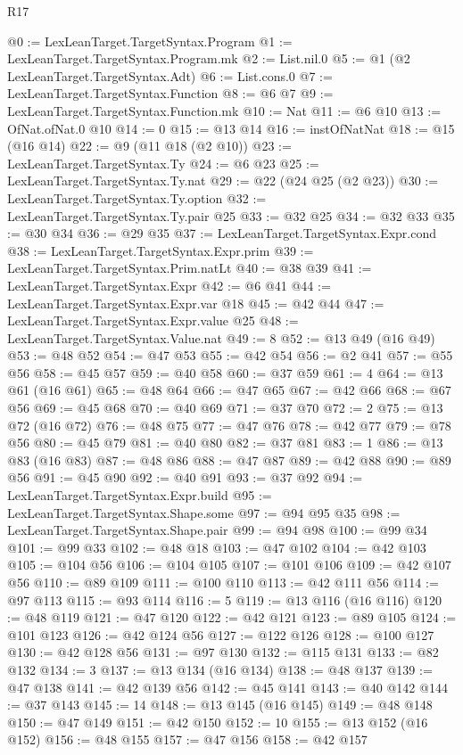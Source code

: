 \begin{lexlean}{R17}
\begin{coremodule}
@0 := LexLeanTarget.TargetSyntax.Program
@1 := LexLeanTarget.TargetSyntax.Program.mk
@2 := List.nil.{0}
@5 := @1 (@2 LexLeanTarget.TargetSyntax.Adt)
@6 := List.cons.{0}
@7 := LexLeanTarget.TargetSyntax.Function
@8 := @6 @7
@9 := LexLeanTarget.TargetSyntax.Function.mk
@10 := Nat
@11 := @6 @10
@13 := OfNat.ofNat.{0} @10
@14 := 0
@15 := @13 @14
@16 := instOfNatNat
@18 := @15 (@16 @14)
@22 := @9 (@11 @18 (@2 @10))
@23 := LexLeanTarget.TargetSyntax.Ty
@24 := @6 @23
@25 := LexLeanTarget.TargetSyntax.Ty.nat
@29 := @22 (@24 @25 (@2 @23))
@30 := LexLeanTarget.TargetSyntax.Ty.option
@32 := LexLeanTarget.TargetSyntax.Ty.pair @25
@33 := @32 @25
@34 := @32 @33
@35 := @30 @34
@36 := @29 @35
@37 := LexLeanTarget.TargetSyntax.Expr.cond
@38 := LexLeanTarget.TargetSyntax.Expr.prim
@39 := LexLeanTarget.TargetSyntax.Prim.natLt
@40 := @38 @39
@41 := LexLeanTarget.TargetSyntax.Expr
@42 := @6 @41
@44 := LexLeanTarget.TargetSyntax.Expr.var @18
@45 := @42 @44
@47 := LexLeanTarget.TargetSyntax.Expr.value @25
@48 := LexLeanTarget.TargetSyntax.Value.nat
@49 := 8
@52 := @13 @49 (@16 @49)
@53 := @48 @52
@54 := @47 @53
@55 := @42 @54
@56 := @2 @41
@57 := @55 @56
@58 := @45 @57
@59 := @40 @58
@60 := @37 @59
@61 := 4
@64 := @13 @61 (@16 @61)
@65 := @48 @64
@66 := @47 @65
@67 := @42 @66
@68 := @67 @56
@69 := @45 @68
@70 := @40 @69
@71 := @37 @70
@72 := 2
@75 := @13 @72 (@16 @72)
@76 := @48 @75
@77 := @47 @76
@78 := @42 @77
@79 := @78 @56
@80 := @45 @79
@81 := @40 @80
@82 := @37 @81
@83 := 1
@86 := @13 @83 (@16 @83)
@87 := @48 @86
@88 := @47 @87
@89 := @42 @88
@90 := @89 @56
@91 := @45 @90
@92 := @40 @91
@93 := @37 @92
@94 := LexLeanTarget.TargetSyntax.Expr.build
@95 := LexLeanTarget.TargetSyntax.Shape.some
@97 := @94 @95 @35
@98 := LexLeanTarget.TargetSyntax.Shape.pair
@99 := @94 @98
@100 := @99 @34
@101 := @99 @33
@102 := @48 @18
@103 := @47 @102
@104 := @42 @103
@105 := @104 @56
@106 := @104 @105
@107 := @101 @106
@109 := @42 @107 @56
@110 := @89 @109
@111 := @100 @110
@113 := @42 @111 @56
@114 := @97 @113
@115 := @93 @114
@116 := 5
@119 := @13 @116 (@16 @116)
@120 := @48 @119
@121 := @47 @120
@122 := @42 @121
@123 := @89 @105
@124 := @101 @123
@126 := @42 @124 @56
@127 := @122 @126
@128 := @100 @127
@130 := @42 @128 @56
@131 := @97 @130
@132 := @115 @131
@133 := @82 @132
@134 := 3
@137 := @13 @134 (@16 @134)
@138 := @48 @137
@139 := @47 @138
@141 := @42 @139 @56
@142 := @45 @141
@143 := @40 @142
@144 := @37 @143
@145 := 14
@148 := @13 @145 (@16 @145)
@149 := @48 @148
@150 := @47 @149
@151 := @42 @150
@152 := 10
@155 := @13 @152 (@16 @152)
@156 := @48 @155
@157 := @47 @156
@158 := @42 @157

\end{coremodule}
\end{lexlean}
